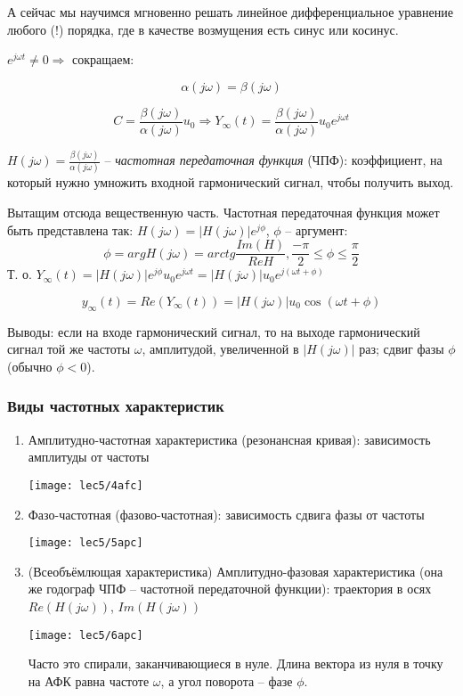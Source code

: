 \documentclass[main.tex]{subfiles}
\begin{document}
А сейчас мы научимся мгновенно решать линейное дифференциальное уравнение любого (!) порядка, где в качестве возмущения есть синус или косинус.

$ e^{j \omega t} \ne 0 \Rightarrow $ сокращаем:

$$ \alpha(j \omega) = \beta(j \omega) $$

$$ C = \frac{\beta(j\omega)}{\alpha(j\omega)} u_0 \Rightarrow Y_{\infty}(t) = \frac{\beta(j \omega)}{\alpha(j \omega)} u_0 e^{j \omega t} $$

$ H(j \omega) = \frac{\beta(j \omega)}{\alpha(j \omega)} $ -- \emph{частотная передаточная функция} (ЧПФ): коэффициент, на который нужно умножить входной гармонический сигнал, чтобы получить выход.

Вытащим отсюда вещественную часть.
Частотная передаточная функция может быть представлена так: $ H(j\omega) = |H(j\omega)| e^{j \phi} $, $\phi$ -- аргумент:
$$ \phi = arg H(j \omega) = arctg \frac{Im(H)}{Re H}, \frac{-\pi}{2} \le \phi \le \frac{\pi}{2} $$
Т. о. $ Y_\infty(t) = |H(j\omega)| e^{j \phi} u_0 e^{j \omega t} = |H(j\omega)|u_0 e^{j(\omega t + \phi)} $

$$ \boxed{ y_\infty(t) = Re(Y_\infty(t)) = |H(j \omega)| u_0 \cos(\omega t + \phi) } $$

Выводы: если на входе гармонический сигнал, то на выходе гармонический сигнал той же частоты $ \omega $, амплитудой, увеличенной в $ |H(j \omega)| $ раз; сдвиг фазы $\phi$ (обычно $ \phi < 0 $).

\subsubsection{Виды частотных характеристик}

\begin{enumerate}[noitemsep]
    \item Амплитудно-частотная характеристика (резонансная кривая): зависимость амплитуды от частоты

    \texttt{[image: lec5/4afc]}

    \item Фазо-частотная (фазово-частотная): зависимость сдвига фазы от частоты

    \texttt{[image: lec5/5apc]}

    \item (Всеобъёмлющая характеристика) Амплитудно-фазовая характеристика (она же годограф ЧПФ -- частотной передаточной функции): траектория в осях $ Re (H(j\omega)) $, $ Im(H(j\omega)) $

    \texttt{[image: lec5/6apc]}

    Часто это спирали, заканчивающиеся в нуле.
    Длина вектора из нуля в точку на АФК равна частоте $ \omega $, а угол поворота -- фазе $ \phi $.
\end{enumerate}
\end{document}
